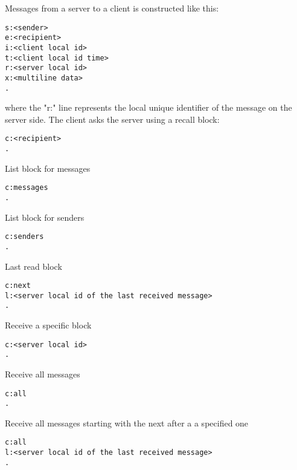 \documentclass[twoside,a4paper,english,12pt,authoryear,openright]{book}
\begin{document}
Messages from a server to a client is constructed like this:

\begin{lstlisting}
s:<sender>
e:<recipient>
i:<client local id>
t:<client local id time>
r:<server local id>
x:<multiline data>
.
\end{lstlisting}

where the "r:" line represents the local unique identifier of the message on the server side. The client asks the server using a recall block:

\begin{lstlisting}
c:<recipient>
.
\end{lstlisting}

List block for messages

\begin{lstlisting}
c:messages
.
\end{lstlisting}

List block for senders

\begin{lstlisting}
c:senders
.
\end{lstlisting}

Last read block

\begin{lstlisting}
c:next
l:<server local id of the last received message>
.
\end{lstlisting}

Receive a specific block

\begin{lstlisting}
c:<server local id>
.
\end{lstlisting}

Receive all messages

\begin{lstlisting}
c:all
.
\end{lstlisting}

Receive all messages starting with the next after a a specified one

\begin{lstlisting}
c:all
l:<server local id of the last received message>
.
\end{lstlisting}


\backmatter 
 

% 

\end{document}
